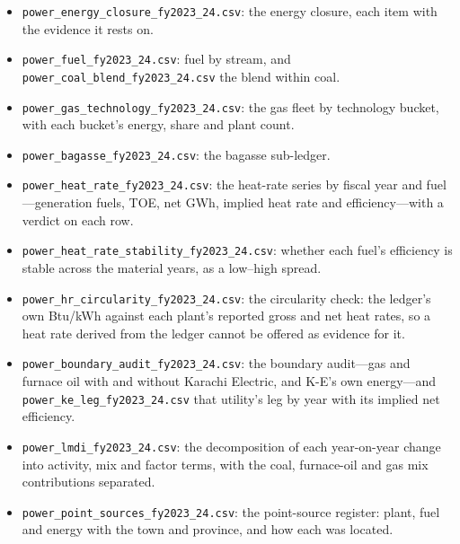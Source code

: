 \begin{itemize}\itemsep2pt
\item \texttt{power\_\allowbreak energy\_\allowbreak closure\_\allowbreak fy2023\_\allowbreak 24.csv}: the energy closure, each item with the evidence it rests on.
\item \texttt{power\_\allowbreak fuel\_\allowbreak fy2023\_\allowbreak 24.csv}: fuel by stream, and \texttt{power\_\allowbreak coal\_\allowbreak blend\_\allowbreak fy2023\_\allowbreak 24.csv} the blend within coal.
\item \texttt{power\_\allowbreak gas\_\allowbreak technology\_\allowbreak fy2023\_\allowbreak 24.csv}: the gas fleet by technology bucket, with each bucket's energy, share and plant count.
\item \texttt{power\_\allowbreak bagasse\_\allowbreak fy2023\_\allowbreak 24.csv}: the bagasse sub-ledger.
\item \texttt{power\_\allowbreak heat\_\allowbreak rate\_\allowbreak fy2023\_\allowbreak 24.csv}: the heat-rate series by fiscal year and fuel---generation fuels, TOE, net GWh, implied heat rate and efficiency---with a verdict on each row.
\item \texttt{power\_\allowbreak heat\_\allowbreak rate\_\allowbreak stability\_\allowbreak fy2023\_\allowbreak 24.csv}: whether each fuel's efficiency is stable across the material years, as a low--high spread.
\item \texttt{power\_\allowbreak hr\_\allowbreak circularity\_\allowbreak fy2023\_\allowbreak 24.csv}: the circularity check: the ledger's own Btu/kWh against each plant's reported gross and net heat rates, so a heat rate derived from the ledger cannot be offered as evidence for it.
\item \texttt{power\_\allowbreak boundary\_\allowbreak audit\_\allowbreak fy2023\_\allowbreak 24.csv}: the boundary audit---gas and furnace oil with and without Karachi Electric, and K-E's own energy---and \texttt{power\_\allowbreak ke\_\allowbreak leg\_\allowbreak fy2023\_\allowbreak 24.csv} that utility's leg by year with its implied net efficiency.
\item \texttt{power\_\allowbreak lmdi\_\allowbreak fy2023\_\allowbreak 24.csv}: the decomposition of each year-on-year change into activity, mix and factor terms, with the coal, furnace-oil and gas mix contributions separated.
\item \texttt{power\_\allowbreak point\_\allowbreak sources\_\allowbreak fy2023\_\allowbreak 24.csv}: the point-source register: plant, fuel and energy with the town and province, and how each was located.

\end{itemize}
